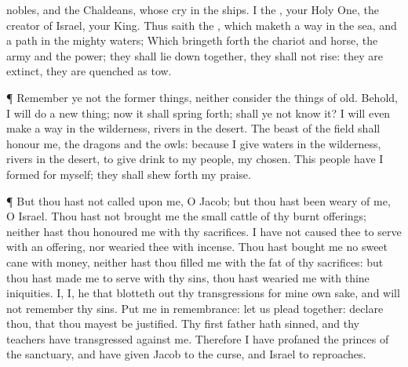 {nobles, and the
Chaldeans, whose
cry
{} in the
ships.
I
{} the
{}, your Holy
One, the
creator of
Israel, your
King.
Thus
saith the
{}, which
maketh a
way in the
sea, and a
path in the
mighty
waters;
Which bringeth
forth the
chariot and
horse, the
army and the
power; they shall lie
down
together, they shall not
rise: they are
extinct, they are
quenched as
tow.
\par }{\PP {}¶
Remember ye not the former
things, neither
consider the things of
old.
Behold, I will
do a new
thing; now it shall spring
forth; shall ye not
know it? I will even
make a
way in the
wilderness,
{}
rivers in the
desert.
The
beast of the
field shall
honour me, the
dragons and the
owls: because I
give
waters in the
wilderness,
{}
rivers in the
desert, to give
drink to my
people, my
chosen.
This
people have I
formed for myself; they shall shew
forth my
praise.
\par }{\PP {}¶ But thou hast not
called upon me, O
Jacob; but thou hast been
weary of me, O
Israel.
Thou hast not
brought me the small
cattle of thy burnt
offerings; neither hast thou
honoured me with thy
sacrifices. I have not caused thee to
serve with an
offering, nor
wearied thee with
incense.
Thou hast
bought me no sweet
cane with
money, neither hast thou
filled me with the
fat of thy
sacrifices: but thou hast made me to
serve with thy
sins, thou hast
wearied me with thine
iniquities.
I,
{} I,
{} he that blotteth
out thy
transgressions for mine own sake, and will not
remember thy
sins.
Put me in
remembrance: let us
plead
together:
declare thou, that thou mayest be
justified.
Thy
first
father hath
sinned, and thy
teachers have
transgressed against me.
Therefore I have
profaned the
princes of the
sanctuary, and have
given
Jacob to the
curse, and
Israel to
reproaches.

}
